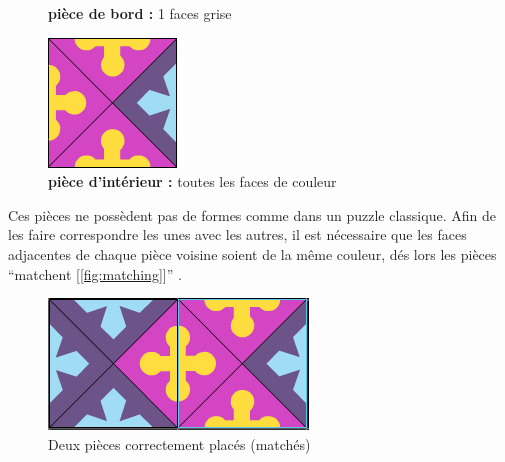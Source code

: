 \begin{figure}[H]
	   	\caption{\textbf{pièce de bord :} 1 faces grise}\label{fig:piece_bord}
	   	\endminipage\hfill
	   	\includegraphics[width=\linewidth]{images/piece_interieure.png}
	   	\caption{\textbf{pièce d'intérieur :} toutes les faces de couleur}\label{fig:piece_interieure}
	   	\endminipage
	\end{figure}

	Ces pièces ne possèdent pas de formes comme dans un puzzle classique. Afin de les faire correspondre les unes avec les autres, il est nécessaire que les faces adjacentes de chaque pièce voisine soient de la même couleur, dés lors les pièces \enquote{matchent [\autoref{fig:matching}]} .
	
	\begin{figure}[H]
		\centering
		\includegraphics{images/matching_pieces.png}
		\caption{Deux pièces correctement placés (matchés)}\label{fig:matching}
	\end{figure}
	

